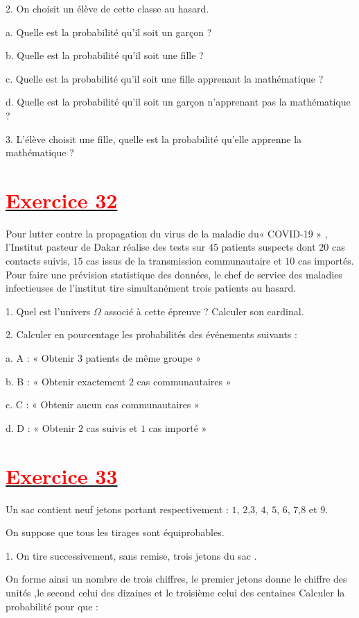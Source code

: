 \documentclass[12pt]{article}
\begin{document}
2. On choisit un élève de cette classe au hasard.

a. Quelle est la probabilité qu'il soit un garçon ?

b. Quelle est la probabilité qu'il soit une fille ?

c. Quelle est la probabilité qu'il soit une fille apprenant la mathématique ?

d. Quelle est la probabilité qu'il soit un garçon n'apprenant pas la mathématique ?
	
3. L'élève choisit une fille, quelle est la probabilité qu'elle apprenne la mathématique ?
\section*{\underline{\textbf{\textcolor{red}{Exercice 32}}}}
Pour lutter contre la propagation du virus de la maladie du« COVID-19 » , l'Institut pasteur de Dakar réalise des tests sur $45$ patients suspects dont $20$ cas contacts suivis, $15$ cas issus de la transmission communautaire et $10$ cas importés. Pour faire une prévision statistique des données, le chef de service des maladies infectieuses de l'institut tire simultanément trois patients au hasard.

1. Quel est l'univers $\Omega$ associé à cette épreuve ? Calculer son cardinal.

2. Calculer en pourcentage les probabilités des événements suivants :

a. A : « Obtenir $3$ patients de même groupe »

b. B : « Obtenir exactement $2$ cas communautaires »

c. C : « Obtenir aucun cas communautaires »

d. D : « Obtenir $2$ cas suivis et $1$ cas importé »
\section*{\underline{\textbf{\textcolor{red}{Exercice 33}}}}
Un sac contient neuf jetons portant respectivement : $1$, $2$,$3$, $4$, $5$, $6$, $7$,$8$ et $9.$

On suppose que tous les tirages sont équiprobables.

1. On tire successivement, sans remise, trois jetons du sac .

On forme ainsi un nombre de trois chiffres, le premier jetons donne le chiffre des unités ,le second celui des dizaines et le troisième celui des centaines Calculer la probabilité pour que :
\end{document}
